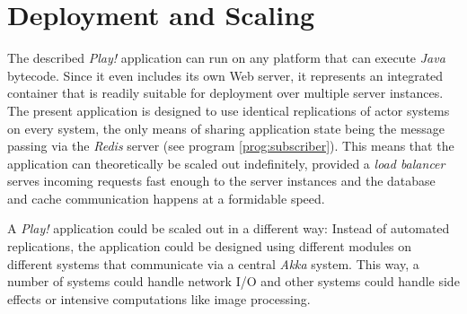 \section{Deployment and Scaling}
The described \textit{Play!} application can run on any platform that can execute \textit{Java} bytecode. Since it even includes its own Web server, it represents an integrated container that is readily suitable for deployment over multiple server instances. The present application is designed to use identical replications of actor systems on every system, the only means of sharing application state being the message passing via the \textit{Redis} server (see program \ref{prog:subscriber}). This means that the application can theoretically be scaled out indefinitely, provided a \textit{load balancer} serves incoming requests fast enough to the server instances and the database and cache communication happens at a formidable speed.

A \textit{Play!} application could be scaled out in a different way: Instead of automated replications, the application could be designed using different modules on different systems that communicate via a central \textit{Akka} system. This way, a number of systems could handle network I/O and other systems could handle side effects or intensive computations like image processing.

